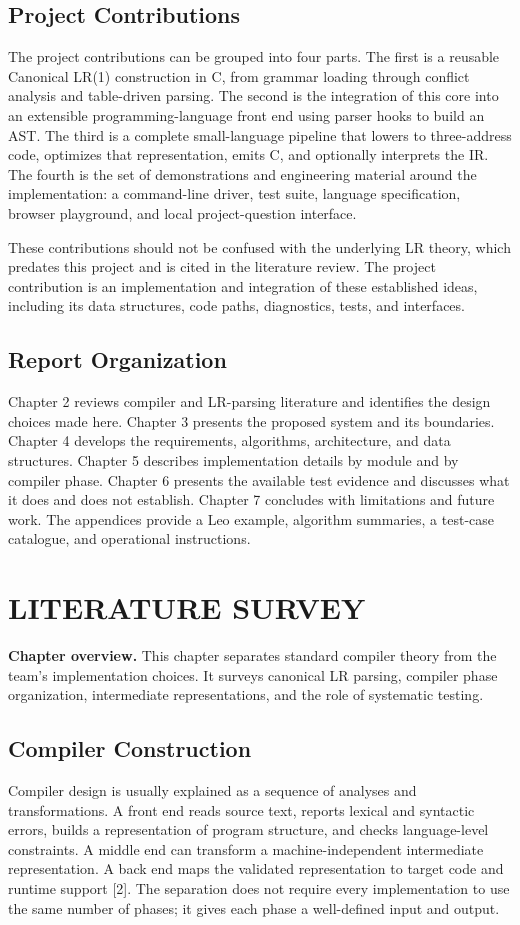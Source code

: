 \documentclass[12pt,a4paper,oneside]{report}
\newcommand{\chapterintro}[1]{\noindent\textbf{Chapter overview.} #1\par\vspace{8pt}}
\begin{document}
\section{Project Contributions}
The project contributions can be grouped into four parts. The first is a reusable Canonical LR(1) construction in C, from grammar loading through conflict analysis and table-driven parsing. The second is the integration of this core into an extensible programming-language front end using parser hooks to build an AST. The third is a complete small-language pipeline that lowers to three-address code, optimizes that representation, emits C, and optionally interprets the IR. The fourth is the set of demonstrations and engineering material around the implementation: a command-line driver, test suite, language specification, browser playground, and local project-question interface.

These contributions should not be confused with the underlying LR theory, which predates this project and is cited in the literature review. The project contribution is an implementation and integration of these established ideas, including its data structures, code paths, diagnostics, tests, and interfaces.

\section{Report Organization}
Chapter 2 reviews compiler and LR-parsing literature and identifies the design choices made here. Chapter 3 presents the proposed system and its boundaries. Chapter 4 develops the requirements, algorithms, architecture, and data structures. Chapter 5 describes implementation details by module and by compiler phase. Chapter 6 presents the available test evidence and discusses what it does and does not establish. Chapter 7 concludes with limitations and future work. The appendices provide a Leo example, algorithm summaries, a test-case catalogue, and operational instructions.

\chapter{LITERATURE SURVEY}
\chapterintro{This chapter separates standard compiler theory from the team's implementation choices. It surveys canonical LR parsing, compiler phase organization, intermediate representations, and the role of systematic testing.}

\section{Compiler Construction}
Compiler design is usually explained as a sequence of analyses and transformations. A front end reads source text, reports lexical and syntactic errors, builds a representation of program structure, and checks language-level constraints. A middle end can transform a machine-independent intermediate representation. A back end maps the validated representation to target code and runtime support [2]. The separation does not require every implementation to use the same number of phases; it gives each phase a well-defined input and output.
\end{document}

